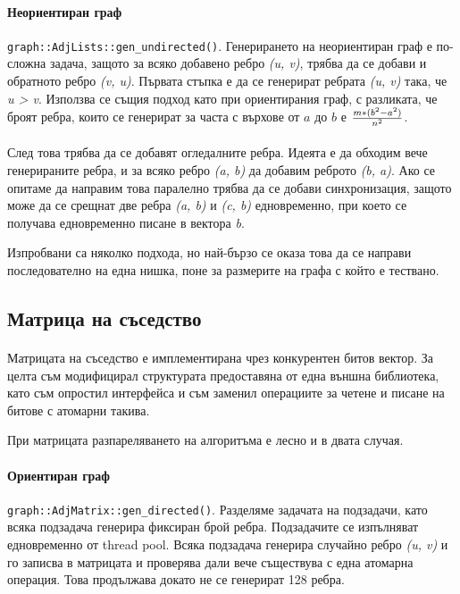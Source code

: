 \paragraph*{Неориентиран граф} \verb|graph::AdjLists::gen_undirected()|. Генерирането на неориентиран граф е по-сложна задача, защото за всяко добавено ребро \textit{(u, v)}, трябва да се добави и обратното ребро \textit{(v, u)}. Първата стъпка е да се генерират ребрата \textit{(u, v)} така, че \textit{u > v}. Използва се същия подход като при ориентирания граф, с разликата, че броят ребра, които се генерират за часта с върхове от $a$ до $b$ е $m * (b^2 - a^2) \over n^2$.

\paragraph*{} След това трябва да се добавят огледалните ребра. Идеята е да обходим вече генерираните ребра, и за всяко ребро \textit{(a, b)} да добавим реброто \textit{(b, a)}. Ако се опитаме да направим това паралелно трябва да се добави синхронизация, защото може да се срещнат две ребра \textit{(a, b)} и \textit{(c, b)} едновременно, при което се получава едновременно писане в вектора \textit{b}.

Изпробвани са няколко подхода, но най-бързо се оказа това да се направи последователно на една нишка, поне за размерите на графа с който е тествано.

\subsection{Матрица на съседство}

\paragraph*{} Матрицата на съседство е имплементирана чрез конкурентен битов вектор. За целта съм модифицирал структурата предоставяна от една външна библиотека, като съм опростил интерфейса и съм заменил операциите за четене и писане на битове с атомарни такива.

При матрицата разпареляването на алгоритъма е лесно и в двата случая.

\paragraph*{Ориентиран граф} \verb|graph::AdjMatrix::gen_directed()|. Разделяме задачата на подзадачи, като всяка подзадача генерира фиксиран брой ребра. Подзадачите се изпълняват едновременно от thread pool. Всяка подзадача генерира случайно ребро \textit{(u, v)} и го записва в матрицата и проверява дали вече съществува с една атомарна операция. Това продължава докато не се генерират 128 ребра.

